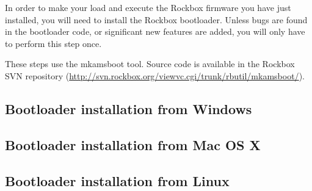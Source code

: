 
In order to make your \playertype{} load and execute the Rockbox
firmware you have just installed, you will need to install the
Rockbox bootloader. Unless bugs are found in the bootloader code, or
significant new features are added, you will only have to perform this
step once.

These steps use the mkamsboot tool. Source code is available in the
Rockbox SVN repository
(\url{http://svn.rockbox.org/viewvc.cgi/trunk/rbutil/mkamsboot/}).

\subsection{Bootloader installation from Windows}

\begin{enumerate}


\end{enumerate}

\subsection{Bootloader installation from Mac OS X}

\begin{enumerate}


\end{enumerate}

\subsection{Bootloader installation from Linux}

\begin{enumerate}


\end{enumerate}